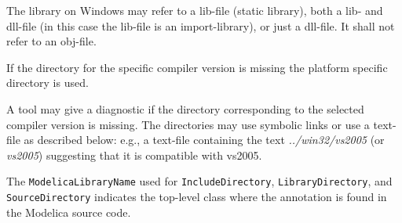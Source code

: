 The library on Windows may refer to a lib-file (static library), both a lib- and dll-file (in this case the lib-file is an import-library), or just a dll-file.
It shall not refer to an obj-file.

If the directory for the specific compiler version is missing the platform specific directory is used.

\begin{nonnormative}
A tool may give a diagnostic if the directory corresponding to the selected compiler version is missing.
The directories may use symbolic links or use a text-file as described below: e.g., a text-file  containing the text \emph{../win32/vs2005} (or \emph{vs2005}) suggesting that it is compatible with vs2005.
\end{nonnormative}

The {\lstinline!ModelicaLibraryName!} used for {\lstinline!IncludeDirectory!}, {\lstinline!LibraryDirectory!}, and {\lstinline!SourceDirectory!} indicates the top-level class where the annotation is found in the Modelica source code.

